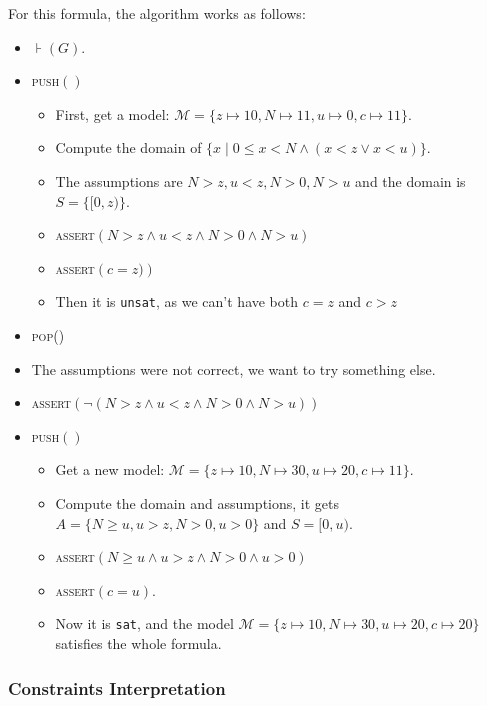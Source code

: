 \begin{example}
For this formula, the algorithm works as follows:
\begin{itemize}
\item $\assert(G)$.
\item \textsc{push}$()$
\begin{itemize}
	\item First, get a model: $\mathcal{M} = \{ z \mapsto 10, N \mapsto 11, u \mapsto 0, c \mapsto 11\}$.
	\item Compute the domain of $\{ x \mid 0 \le x < N \land (x < z \lor x < u) \}$.
	\item The assumptions are $N > z, u < z, N > 0, N > u$ and the domain is $S = \{ [0, z) \}$.
	\item \textsc{assert}$\left(N > z \land u < z \land N > 0 \land N > u\right)$
	\item \textsc{assert}$\left(c = z)\right)$
	\item Then it is \texttt{unsat}, as we can't have both $c = z$ and $c> z$
\end{itemize}
\item \textsc{pop}()
\item The assumptions were not correct, we want to try something else.
\item \textsc{assert}$\left(\lnot \left(N > z \land u < z \land N > 0 \land N > u\right)\right)$
\item \textsc{push}$()$
\begin{itemize}
\item Get a new model: $\mathcal{M} = \{ z \mapsto 10, N \mapsto 30, u \mapsto 20, c \mapsto 11\}$.
\item Compute the domain and assumptions, it gets $A = \{ N \ge u, u > z, N > 0, u > 0\}$ and $S = [0, u)$.
\item \textsc{assert}$\left(N \ge u \land u > z \land N > 0 \land u > 0\right)$
\item \textsc{assert}$\left(c = u\right)$.
\item Now it is \texttt{sat}, and the model $\mathcal{M} = \{ z \mapsto 10, N \mapsto 30, u \mapsto 20, c \mapsto 20\}$ satisfies the whole formula.
\end{itemize}
\end{itemize}

\end{example}

\subsubsection{Constraints Interpretation}

